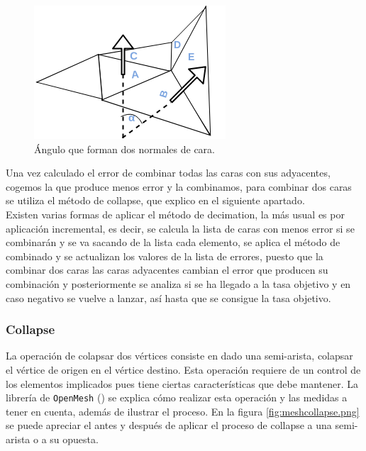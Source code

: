 \begin{figure} %
	\centering
	\includegraphics[scale=1]{imagenes/error_decimation.png} 
	\caption{ Ángulo que forman dos normales de cara.} \label{fig:error_decimation.png}
\end{figure}


Una vez calculado el error de combinar todas las caras con sus adyacentes, cogemos la que produce menos error y la combinamos, para combinar dos caras se utiliza el método de collapse, que explico en el siguiente apartado.\\

Existen varias formas de aplicar el método de decimation, la más usual es por aplicación incremental, es decir, se calcula la lista de caras con menos error si se combinarán y se va sacando de la lista cada elemento, se aplica el método de combinado y se actualizan los valores de la lista de errores, puesto que la combinar dos caras las caras adyacentes cambian el error que producen su combinación y posteriormente se analiza si se ha llegado a la tasa objetivo y en caso negativo se vuelve a lanzar, así hasta que se consigue la tasa objetivo.


\subsubsection{ Collapse}

La operación de colapsar dos vértices consiste en dado una semi-arista, colapsar el vértice de origen en el vértice destino. Esta operación requiere de un control de los elementos implicados pues tiene ciertas características que debe mantener. La librería de \texttt{OpenMesh} (\cite{OpenMeshBasicOperations}) se explica cómo realizar esta operación y las medidas a tener en cuenta, además de ilustrar el proceso. En la figura \ref{fig:meshcollapse.png} se puede apreciar el antes y después de aplicar el proceso de collapse a una semi-arista o a su opuesta.\\

